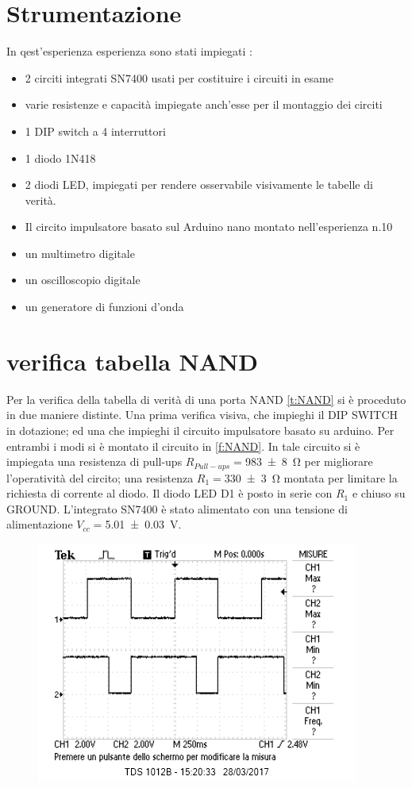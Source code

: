 \section{Strumentazione}
	In qest'esperienza esperienza sono stati impiegati :
	\begin{itemize}
		\item 2 circiti integrati SN7400 usati per costituire i circuiti in esame
		\item varie resistenze e capacità impiegate anch'esse per il montaggio dei circiti
		\item 1 DIP switch a 4 interruttori
		\item 1 diodo 1N418
		\item 2 diodi LED, impiegati per rendere osservabile visivamente le tabelle di verità. 
		\item Il circito impulsatore basato sul Arduino nano montato nell'esperienza n.10
		\item un multimetro digitale
		\item un oscilloscopio digitale 
		\item un generatore di funzioni d'onda
	\end{itemize}

\section{verifica tabella NAND}
	Per la verifica della tabella di verità di una porta NAND 
	\tablename{
		 \ref{t:NAND}
	 }
	si è proceduto in due maniere distinte. Una prima verifica visiva, che impieghi il DIP SWITCH in dotazione; 
	ed una che impieghi il circuito impulsatore basato su arduino.
	Per entrambi i modi si è montato il circuito in \figurename{ \ref{f:NAND}}.
	In tale circuito si è 
	impiegata una resistenza di pull-ups $R_{Pull-ups}=$\SI{983	\pm 8	}{\ohm} per migliorare 
	l'operatività del circito;
	una resistenza $R_{1}=$\SI{330 \pm 3 }{\ohm} montata per  limitare la richiesta di corrente al diodo.
	Il diodo LED D1 è posto in serie con $R_{1}$ e chiuso su GROUND.
	L'integrato  SN7400 è stato alimentato con una tensione di alimentazione $V_{cc}=$\SI{ 5.01 \pm 0.03  }{\volt}.
	\begin{figure}[htb]
		\includegraphics[scale=0.35]{../Figs-Tabs/NAND.png}
	\end{figure}\label{f:NAND}

